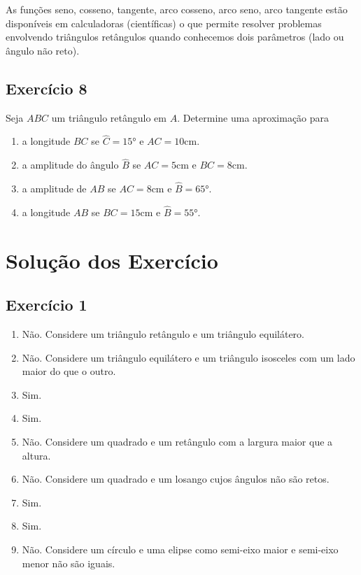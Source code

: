 As funções seno, cosseno, tangente, arco cosseno, arco seno, arco tangente
estão disponíveis em calculadoras (científicas) o que permite resolver problemas
envolvendo triângulos retângulos quando conhecemos dois parâmetros (lado ou
ângulo não reto).

\subsection{Exercício 8}

Seja $ABC$ um triângulo retângulo em $A$. Determine uma aproximação para

\begin{enumerate}
\item a longitude $BC$ se $\widehat{C} = 15°$ e $AC = 10\text{cm}$.
\item a amplitude do ângulo $\widehat{B}$ se $AC = 5\text{cm}$ e
  $BC = 8\text{cm}$.
\item a amplitude de $AB$ se $AC = 8\text{cm}$ e $\widehat{B} = 65°$.
\item a longitude $AB$ se $BC = 15\text{cm}$ e $\widehat{B} = 55°$.
\end{enumerate}

\section{Solução dos Exercício}

\subsection{Exercício 1}

\begin{enumerate}
  \item Não. Considere um triângulo retângulo e um triângulo equilátero.
  \item Não. Considere um triângulo equilátero e um triângulo isosceles com um
    lado maior do que o outro.
  \item Sim.
  \item Sim.
  \item Não. Considere um quadrado e um retângulo com a largura maior que a altura.
  \item Não. Considere um quadrado e um losango cujos ângulos não são retos.
  \item Sim.
  \item Sim.
  \item Não. Considere um círculo e uma elipse como semi-eixo maior e semi-eixo
    menor não são iguais.
\end{enumerate}

